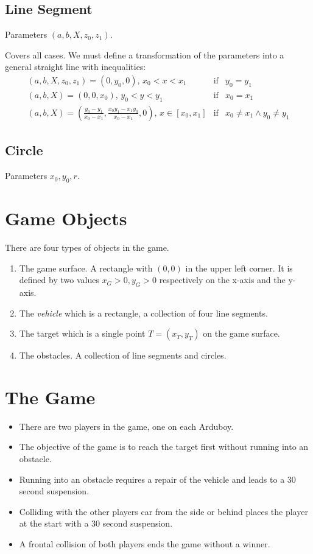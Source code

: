 \documentclass[11pt]{article}
\begin{document}
\subsection*{Line Segment}

Parameters $(a, b, X, z_0, z_1)$. 

Covers all cases. We must define a transformation of the parameters into a
general straight line with inequalities:
\begin{eqnarray*}
    (a, b, X, z_0, z_1) = (0, y_0, 0) ,\, x_0 < x < x_1 &\text{if}& 
        y_0 = y_1\\
    (a, b, X) = (0, 0, x_0) ,\, y_0 < y < y_1 &\text{if}& 
        x_0 = x_1\\
    (a, b, X) = \left(\frac{y_0 - y_1}{x_0-x_1},
            \frac{x_0 y_1 - x_1 y_0}{x_0 - x_1}, 0\right),\,
    x\in[x_0, x_1] &\text{if}& x_0\neq x_1 \land y_0\neq y_1
\end{eqnarray*}

\subsection*{Circle}

Parameters $x_0, y_0, r$.

\section{Game Objects}
\label{sec-game-objects}
There are four types of objects in the game. 
\begin{enumerate}
    \item The game surface. A rectangle with $(0,0)$ in the upper left corner. 
        It is defined by two values $x_G > 0, y_G>0$ respectively on the x-axis
        and the y-axis.
    \item The {\sl vehicle} which is a rectangle, a collection of four line
        segments.
    \item The target which is a single point $T = (x_T, y_T)$ on the game
        surface.
    \item The obstacles. A collection of line segments and circles.
\end{enumerate}

\section{The Game}
\label{sec-the-game}
\begin{itemize}
    \item There are two players in the game, one on each Arduboy. 
    \item The objective of the game is to reach the target first without 
        running into an obstacle. 
    \item Running into an obstacle requires a repair of the vehicle and leads 
        to a 30 second suspension. 
    \item Colliding with the other players car from the side or behind places
        the player at the start with a 30 second suspension.
    \item A frontal collision of both players ends the game without a winner.
\end{itemize}
\end{document}
